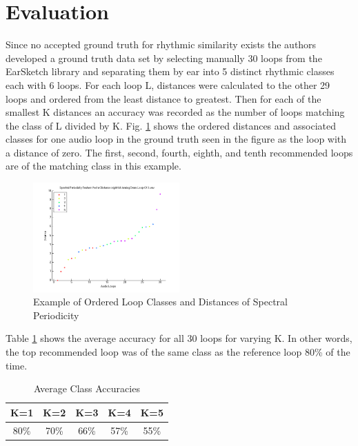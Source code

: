 \documentclass{article}
\begin{document}
\section{Evaluation}
Since no accepted ground truth for rhythmic similarity exists the authors developed a ground truth data set by selecting manually 30 loops from the EarSketch library and separating them by ear into 5 distinct rhythmic classes each with 6 loops. For each loop L, distances were calculated to the other 29 loops and ordered from the least distance to greatest. Then for each of the smallest K distances an accuracy was recorded as the number of loops matching the class of L divided by K. Fig. \ref{fig:eval1_dist} shows the ordered distances and associated classes for one audio loop in the ground truth seen in the figure as the loop with a distance of zero. The first, second, fourth, eighth, and tenth recommended loops are of the matching class in this example.

\begin{figure}[h!]
 
  \captionsetup{justification=centering}
    \includegraphics[width=0.5\textwidth]{distance_graph_eval1.png}
     \caption{Example of Ordered Loop Classes and Distances of Spectral Periodicity}   
\label{fig:eval1_dist}

\end{figure}

Table \ref{tab:bs_eval} shows the average accuracy for all 30 loops for varying K. In other words, the top recommended loop was of the same class as the reference loop 80\% of the time.

\begin{table}[h!]
\centering
  \begin{center}
    \begin{tabular}{| c | c | c | c | c |}
    \hline
    K=1 & K=2 & K=3 & K=4 & K=5 \\
    \hline
    80\% & 70\% & 66\%  & 57\% & 55\% \\
    \hline
    \end{tabular}
      \caption{Average Class Accuracies}\label{tab:bs_eval}
  \end{center}
\end{table}
\end{document}
